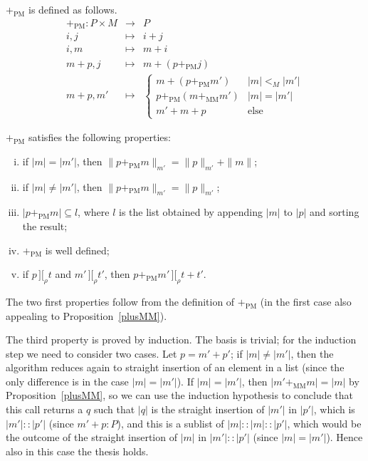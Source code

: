 \documentclass[numreferences]{kluwer}
\newcommand{\intII}{\,]\![}
\newcommand{\intrel}{\mathbin{\intII_{\rho}}}
\newcommand{\coeff}[2]{\ensuremath{\|#2\|_{#1}}}
\newcommand{\plusMM}{\ensuremath{+_{\mathrm{MM}}}}
\newcommand{\plusPM}{\ensuremath{+_{\mathrm{PM}}}}
\begin{document}
\begin{article}
\begin{definition}\label{defn:plusPM} {\plusPM} is defined as follows.
\begin{eqnarray*}
\plusPM : P\times M & \to & P \\
 i, j & \mapsto & i+j \\
 i, m & \mapsto & m+i \\
 m+p, j & \mapsto & m+(p\plusPM j) \\
 m+p, m' & \mapsto &
\left\{\begin{array}{ll} m+(p\plusPM m') & |m|<_M|m'| \\
 p\plusPM(m\plusMM m') & |m|=|m'| \\
 m'+m+p & \mbox{else}\end{array}\right.
\end{eqnarray*}
\end{definition}

\begin{proposition}\label{plusPM}
{\plusPM} satisfies the following properties:
\begin{enumerate}[(i)]
\item if $|m|=|m'|$, then $\coeff{m'}{p\plusPM m}=\coeff{m'}p+\|m\|$;
\item if $|m|\neq|m'|$, then $\coeff{m'}{p\plusPM m}=\coeff{m'}p$;
\item $|p\plusPM m|\subseteq l$, where $l$ is the list obtained by appending
$|m|$ to $|p|$ and sorting the result;
\item {\plusPM} is well defined;
\item if $p\intrel t$ and $m'\intrel t'$, then $p\plusPM m'\intrel t+t'$.
\end{enumerate}
\end{proposition}
\begin{pf}
The two first properties follow from the definition of {\plusPM} (in the
first case also appealing to Proposition~\ref{plusMM}).

The third property is proved by induction.  The basis is trivial; for
the induction step we need to consider two cases.  Let $p=m'+p'$; if
$|m|\neq|m'|$, then the algorithm reduces again to straight insertion
of an element in a list (since the only difference is in the case
$|m|=|m'|$).  If $|m|=|m'|$, then $|m'\plusMM m|=|m|$ by
Proposition~\ref{plusMM}, so we can use the induction hypothesis to
conclude that this call returns a $q$ such that $|q|$ is the straight
insertion of $|m'|$ in $|p'|$, which is $|m'|::|p'|$ (since $m'+p:P$),
and this is a sublist of $|m|::|m|::|p'|$, which would be the outcome of
the straight insertion of $|m|$ in $|m'|::|p'|$ (since $|m|=|m'|$).
Hence also in this case the thesis holds.


\end{pf}
\end{article}
\end{document}
